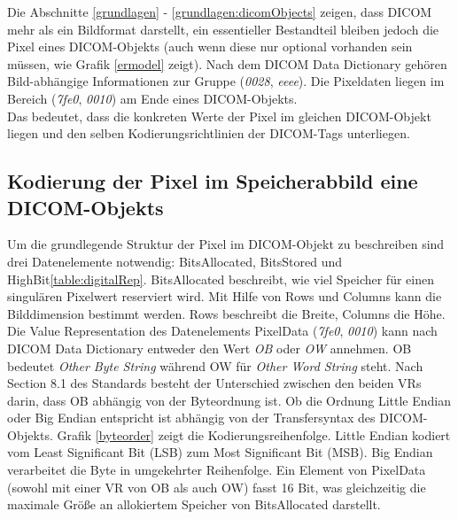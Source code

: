 Die Abschnitte \ref{grundlagen} - \ref{grundlagen:dicomObjects} zeigen, dass DICOM mehr als ein Bildformat darstellt, ein essentieller Bestandteil bleiben jedoch die Pixel eines DICOM-Objekts (auch wenn diese nur optional vorhanden sein müssen, wie Grafik \ref{ermodel} zeigt). Nach dem DICOM Data Dictionary gehören Bild-abhängige Informationen zur Gruppe (\textit{0028}, \textit{eeee}).
Die Pixeldaten liegen im Bereich (\textit{7fe0}, \textit{0010}) am Ende eines DICOM-Objekts.\\
Das bedeutet, dass die konkreten Werte der Pixel im gleichen DICOM-Objekt liegen und den selben Kodierungsrichtlinien der DICOM-Tags unterliegen.

\subsection{Kodierung der Pixel im Speicherabbild eine DICOM-Objekts} \label{pixelkodierung}

Um die grundlegende Struktur der Pixel im DICOM-Objekt zu beschreiben sind drei Datenelemente notwendig: BitsAllocated, BitsStored und HighBit\ref{table:digitalRep}. BitsAllocated beschreibt, wie viel Speicher für einen singulären Pixelwert reserviert wird. Mit Hilfe von Rows und Columns kann die Bilddimension bestimmt werden. Rows beschreibt die Breite, Columns die Höhe. Die Value Representation des Datenelements PixelData (\textit{7fe0}, \textit{0010}) kann nach DICOM Data Dictionary entweder den Wert \textit{OB} oder \textit{OW} annehmen. OB bedeutet \textit{Other Byte String} während OW für \textit{Other Word String} steht. Nach Section 8.1 des Standards\cite{dicom:structure} besteht der Unterschied zwischen den beiden VRs darin, dass OB abhängig von der Byteordnung ist. Ob die Ordnung Little Endian oder Big Endian entspricht ist abhängig von der Transfersyntax des DICOM-Objekts.
Grafik \ref{byteorder} zeigt die Kodierungsreihenfolge. Little Endian kodiert vom Least Significant Bit (LSB) zum Most Significant Bit (MSB). Big Endian verarbeitet die Byte in umgekehrter Reihenfolge. Ein Element von PixelData (sowohl mit einer VR von OB als auch OW) fasst 16 Bit, was gleichzeitig die maximale Größe an allokiertem Speicher von BitsAllocated darstellt.

